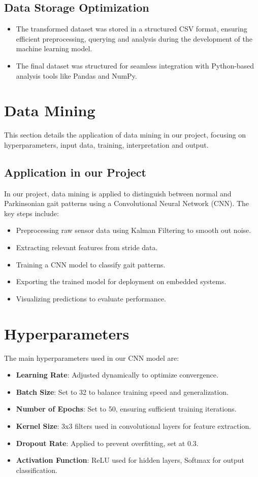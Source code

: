 \subsection{Data Storage Optimization}
\begin{itemize}
	\item The transformed dataset was stored in a structured CSV format, ensuring efficient preprocessing, querying and analysis during the development of the machine learning model.
	\item The final dataset was structured for seamless integration with Python-based analysis tools like Pandas and NumPy.
\end{itemize}

\section{Data Mining}

This section details the application of data mining in our project, focusing on hyperparameters, input data, training, interpretation and output.

\subsection{Application in our Project}
In our project, data mining is applied to distinguish between normal and Parkinsonian gait patterns using a Convolutional Neural Network (CNN). The key steps include:
\begin{itemize}
	\item Preprocessing raw sensor data using Kalman Filtering to smooth out noise.
	\item Extracting relevant features from stride data.
	\item Training a CNN model to classify gait patterns.
	\item Exporting the trained model for deployment on embedded systems.
	\item Visualizing predictions to evaluate performance.
\end{itemize}

\section{Hyperparameters}
The main hyperparameters used in our CNN model are:

\begin{itemize}
	\item \textbf{Learning Rate}: Adjusted dynamically to optimize convergence.
	\item \textbf{Batch Size}: Set to 32 to balance training speed and generalization.
	\item \textbf{Number of Epochs}: Set to 50, ensuring sufficient training iterations.
	\item \textbf{Kernel Size}: 3x3 filters used in convolutional layers for feature extraction.
	\item \textbf{Dropout Rate}: Applied to prevent overfitting, set at 0.3.
	\item \textbf{Activation Function}: ReLU used for hidden layers, Softmax for output classification.
\end{itemize}

